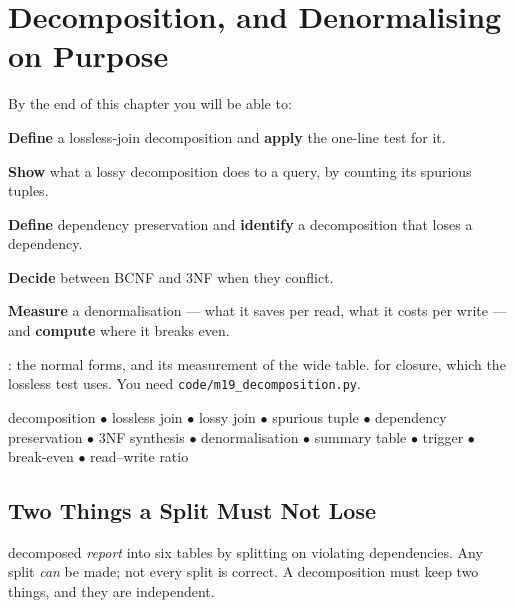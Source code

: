 \chapter{Decomposition, and Denormalising on Purpose}\label{ch:decomposition}

\begin{outcomes}
By the end of this chapter you will be able to:
\begin{tight}
  \item \textbf{Define} a lossless-join decomposition and \textbf{apply} the
        one-line test for it.
  \item \textbf{Show} what a lossy decomposition does to a query, by counting
        its spurious tuples.
  \item \textbf{Define} dependency preservation and \textbf{identify} a
        decomposition that loses a dependency.
  \item \textbf{Decide} between BCNF and 3NF when they conflict.
  \item \textbf{Measure} a denormalisation --- what it saves per read, what it
        costs per write --- and \textbf{compute} where it breaks even.
\end{tight}
\end{outcomes}

\begin{prereq}
: the normal forms, and its measurement of the wide table.
 for closure, which the lossless test uses. You need
\texttt{code/m19\_decomposition.py}.
\end{prereq}

\begin{keyterms}
decomposition $\bullet$ lossless join $\bullet$ lossy join $\bullet$ spurious
tuple $\bullet$ dependency preservation $\bullet$ 3NF synthesis $\bullet$
denormalisation $\bullet$ summary table $\bullet$ trigger $\bullet$
break-even $\bullet$ read--write ratio
\end{keyterms}

\section{Two Things a Split Must Not Lose}

 decomposed \textit{report} into six tables by splitting on
violating dependencies. Any split \emph{can} be made; not every split is
correct. A decomposition must keep two things, and they are independent.

